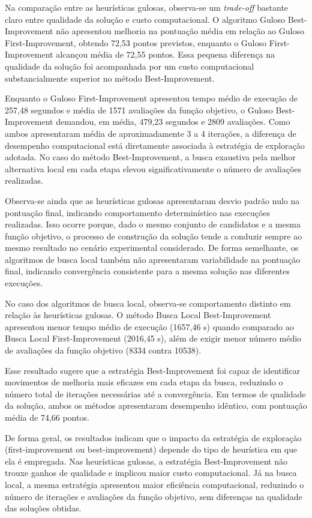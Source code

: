 Na comparação entre as heurísticas gulosas, observa-se um \textit{trade-off} bastante claro
entre qualidade da solução e custo computacional. 
O algoritmo Guloso Best-Improvement não apresentou melhoria na pontuação média em 
relação ao Guloso First-Improvement, obtendo 72,53 pontos previstos, enquanto o 
Guloso First-Improvement alcançou média de 72,55 pontos. Essa pequena 
diferença na qualidade da solução foi acompanhada por um custo computacional 
substancialmente superior no método Best-Improvement.

Enquanto o Guloso First-Improvement apresentou tempo médio de execução de 257,48 
segundos e média de 1571 avaliações da função objetivo, o Guloso Best-Improvement 
demandou, em média, 479,23 segundos e 2809 avaliações. Como ambos apresentaram média de 
aproximadamente 3 a 4 iterações, a diferença de desempenho computacional está 
diretamente associada à estratégia de exploração adotada. No caso do método 
Best-Improvement, a busca exaustiva pela melhor alternativa local em cada etapa elevou 
significativamente o número de avaliações realizadas.

Observa-se ainda que as heurísticas gulosas apresentaram desvio padrão nulo 
na pontuação final, indicando comportamento determinístico nas execuções realizadas. 
Isso ocorre porque, dado o mesmo conjunto de candidatos e a mesma função objetivo, 
o processo de construção da solução tende a conduzir sempre ao mesmo resultado no 
cenário experimental considerado. De forma semelhante, os algoritmos de busca local 
também não apresentaram variabilidade na pontuação final, indicando convergência 
consistente para a mesma solução nas diferentes execuções.

No caso dos algoritmos de busca local, observa-se comportamento distinto em 
relação às heurísticas gulosas. O método Busca Local Best-Improvement apresentou 
menor tempo médio de execução (1657,46 s) quando comparado ao Busca Local 
First-Improvement (2016,45 s), além de exigir menor número médio de avaliações da 
função objetivo (8334 contra 10538).

Esse resultado sugere que a estratégia Best-Improvement foi capaz de identificar 
movimentos de melhoria mais eficazes em cada etapa da busca, reduzindo o número 
total de iterações necessárias até a convergência. Em termos de qualidade da solução, 
ambos os métodos apresentaram desempenho idêntico, com pontuação média de 74,66 pontos.

De forma geral, os resultados indicam que o impacto da estratégia de exploração 
(first-improvement ou best-improvement) depende do tipo de heurística em que ela é 
empregada. Nas heurísticas gulosas, a estratégia Best-Improvement não trouxe ganhos 
de qualidade e implicou maior custo computacional. Já na busca local, a mesma estratégia 
apresentou maior eficiência computacional, reduzindo o número de iterações e avaliações 
da função objetivo, sem diferenças na qualidade das soluções obtidas.

